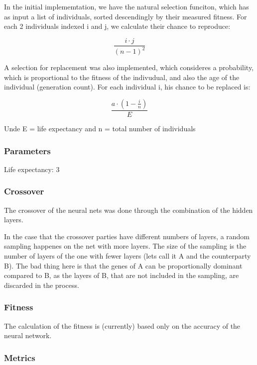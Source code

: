 \documentclass[11pt]{article}
\begin{document}
In the initial implememtation, we have the natural selection funciton,
which has as input a list of individuals, sorted descendingly by their
measured fitness. For each 2 individuals indexed i and j, we calculate
their chance to reproduce:

\[\frac{i \cdot j}{{(n - 1)}^{2}}\]

A selection for replacement was also implemented, which consideres a
probability, which is proportional to the fitness of the indivudual, and
also the age of the individual (generation count). For each individual
i, his chance to be replaced is:

\[\frac{a \cdot (1 - \frac{i}{n})}{E}\]

Unde E = life expectancy and n = total number of individuals

\hypertarget{parameters}{%
\subsubsection*{Parameters}\label{parameters}}

Life expectancy: 3

\hypertarget{crossover}{%
\subsubsection*{Crossover}\label{crossover}}

The crossover of the neural nets was done through the combination of the
hidden layers.

In the case that the crossover parties have different numbers of layers,
a random sampling happenes on the net with more layers. The size of the
sampling is the number of layers of the one with fewer layers (lets call
it A and the counterparty B). The bad thing here is that the genes of A
can be proportionally dominant compared to B, as the layers of B, that
are not included in the sampling, are discarded in the process.

\hypertarget{fitness}{%
\subsubsection*{Fitness}\label{fitness}}

The calculation of the fitness is (currently) based only on the accuracy
of the neural network.

\hypertarget{metrics}{%
\subsubsection*{Metrics}\label{metrics}}
\end{document}
